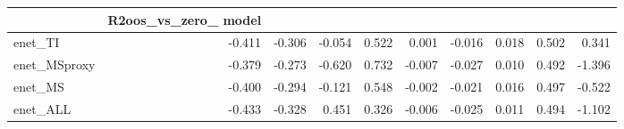 \begin{tabular}{lrrrrrrrrr}
\toprule
 & R2oos_vs_zero_%
model &  &  &  &  &  &  &  &  &  \\
\midrule
enet_TI & -0.411 & -0.306 & -0.054 & 0.522 & 0.001 & -0.016 & 0.018 & 0.502 & 0.341 \\
enet_MSproxy & -0.379 & -0.273 & -0.620 & 0.732 & -0.007 & -0.027 & 0.010 & 0.492 & -1.396 \\
enet_MS & -0.400 & -0.294 & -0.121 & 0.548 & -0.002 & -0.021 & 0.016 & 0.497 & -0.522 \\
enet_ALL & -0.433 & -0.328 & 0.451 & 0.326 & -0.006 & -0.025 & 0.011 & 0.494 & -1.102 \\
\bottomrule
\end{tabular}
